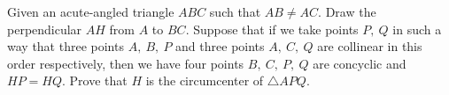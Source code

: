 Given an acute-angled triangle $ ABC$ such that $ AB\neq AC$. Draw the perpendicular $ AH$ from $ A$ to $ BC$. Suppose that if we take points $ P,\ Q$ in such a way that three points $ A,\ B,\ P$ and three points $ A,\ C,\ Q$ are collinear in this order respectively, then we have four points $ B,\ C,\ P,\ Q$ are concyclic and $ HP = HQ$. Prove that $ H$ is the circumcenter of $ \triangle{APQ}$.